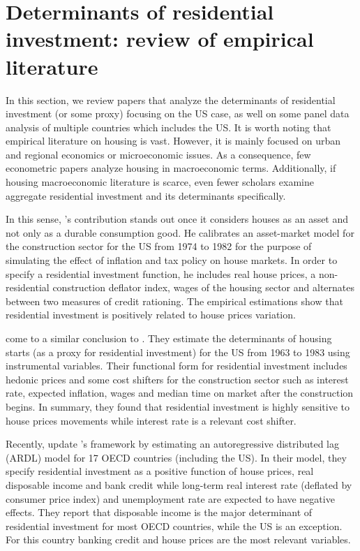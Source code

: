\documentclass[12pt, a4paper]{article}
\begin{document}
\section{Determinants of residential investment: review of empirical literature}
\label{sec:org21633d5}
\label{sec:empirical_review}
In this section, we review papers that analyze the determinants of residential investment (or some proxy) focusing on the US case, as well on some panel data analysis of multiple countries which includes the US.
It is worth noting that empirical literature on housing is vast.
However, it is mainly focused on urban and regional economics or microeconomic issues.
As a consequence, few econometric papers analyze housing in macroeconomic terms.
Additionally, if housing macroeconomic literature is scarce, even fewer scholars examine aggregate residential investment and its determinants specifically.

In this sense, \citeauthor*{poterba_tax_1984}'s \citeyear{poterba_tax_1984} contribution stands out once it considers houses as an asset and not only as a durable consumption good.
He calibrates an asset-market model for the construction sector for the US from 1974 to 1982 for the purpose of simulating the effect of inflation and tax policy on house markets.
In order to specify a residential investment function, he includes real house prices, a non-residential construction deflator index, wages of the housing sector and alternates between two measures  of  credit  rationing.
The empirical estimations show that residential investment is positively related to house prices variation.

\textcite{topel_1988_Housing} come to a similar conclusion to \textcite{poterba_tax_1984}.
They estimate the determinants of housing starts (as a proxy for residential investment) for the US from 1963 to 1983 using instrumental variables.
Their functional form for residential investment includes hedonic prices and some cost shifters for the construction sector such as interest rate, expected inflation, wages and median time on market after the construction begins.
In summary, they found that residential investment is highly sensitive to house prices movements while interest rate is a relevant cost shifter.

Recently,  \textcite{arestis_residential_2015} update \citeauthor*{poterba_tax_1984}'s \citeyear{poterba_tax_1984} framework by estimating an autoregressive distributed lag (ARDL) model for 17 OECD countries (including the US).
In their model, they specify residential investment as a positive function of house prices, real disposable income and bank credit while long-term real interest rate (deflated by consumer price index) and unemployment rate are expected to have negative effects.
They report that disposable income is the major determinant of residential investment for most OECD countries, while the US is an exception.
For this country banking credit and house prices are the most relevant variables.
\end{document}

